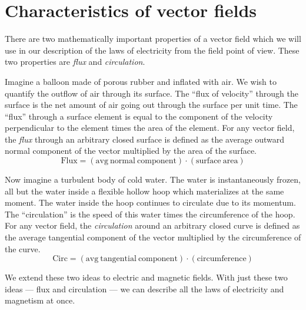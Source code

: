 \section{Characteristics of vector fields}

There are two mathematically important properties of a vector field
which we will use in our description of the laws of electricity
from the field point of view.  
These two properties are \emph{flux} and \emph{circulation}.

Imagine a balloon made of porous rubber and inflated with air.
We wish to quantify the outflow of air through its surface.
The ``flux of velocity'' through the surface is 
the net amount of air going out through the surface per unit time.
The ``flux'' through a surface element
is equal to the component of the velocity perpendicular 
to the element times the area of the element.
For any vector field, the \emph{flux} through an arbitrary closed surface
is defined as the average outward normal component of the vector
multiplied by the area of the surface.
\begin{equation}
  \mathrm{Flux} = (\mathrm{avg\ normal\ component}) \cdot (\mathrm{surface\ area})
\end{equation}

Now imagine a turbulent body of cold water.
The water is instantaneously frozen, all but the water inside a flexible hollow hoop
which materializes at the same moment.
The water inside the hoop continues to circulate due to its momentum.
The ``circulation'' is the speed of this water times the circumference of the hoop.
For any vector field, the \emph{circulation} around an arbitrary closed curve
is defined as the average tangential component of the vector
multiplied by the circumference of the curve.
\begin{equation}
  \mathrm{Circ} = (\mathrm{avg\ tangential\ component}) \cdot (\mathrm{circumference})
\end{equation}

We extend these two ideas to electric and magnetic fields.
With just these two ideas --- flux and circulation ---
we can describe all the laws of electricity and magnetism at once.



